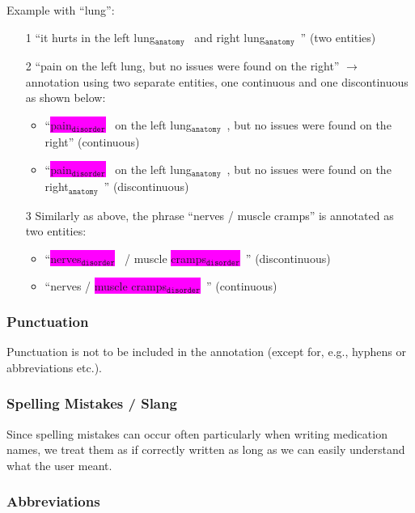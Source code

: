 \documentclass[12pt]{article}
\theoremstyle{definition}
\newcommand{\anatomy}[1]{\colorbox{dollarbill}{#1$_{\texttt{anatomy}}$}\ }
\newcommand{\disorder}[1]{\colorbox{fuchsia}{#1$_{\texttt{disorder}}$}\ }
\begin{document}
Example with ``lung'':
\begin{enumerate}
    \item[1] ``it hurts in the \anatomy{left lung} and \anatomy{right lung}'' (two entities)
    
    \item[2] ``pain on the left lung, but no issues were found on the right'' $\rightarrow$ annotation using two separate entities, one continuous and one discontinuous as shown below:
    \begin{itemize}
        \item ``\disorder{pain} on the \anatomy{left lung}, but no issues were found on the right'' (continuous)
        \item ``\disorder{pain} on the left \anatomy{lung}, but no issues were found on the \anatomy{right}'' (discontinuous) 
    \end{itemize}

    \item[3] Similarly as above, the phrase ``nerves / muscle cramps'' is annotated as two entities:
    \begin{itemize}
        \item ``\disorder{nerves} / muscle \disorder{cramps}'' (discontinuous)
        \item ``nerves / \disorder{muscle cramps}'' (continuous)
    \end{itemize}


\end{enumerate}



\subsubsection*{Punctuation}

Punctuation is not to be included in the annotation (except for, e.g., hyphens or abbreviations etc.).

\subsubsection*{Spelling Mistakes / Slang}

Since spelling mistakes can occur often particularly when writing medication names, we treat them as if correctly written as long as we can easily understand what the user meant.

\subsubsection*{Abbreviations}
\end{document}
